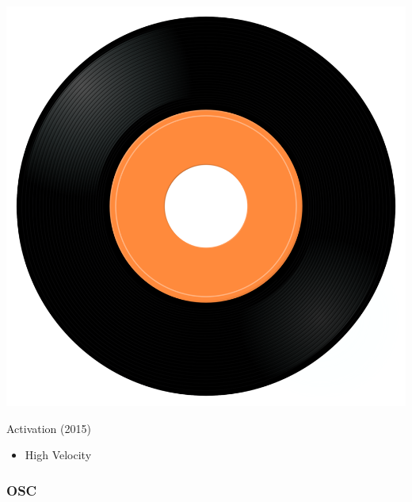\begin{minipage}[t]{0.25\textwidth}\vspace{0pt}
\captionsetup{type=figure}
\includegraphics[width=\textwidth]{Images/cover.png}
\caption*{Activation (2015)}
\end{minipage}
\begin{minipage}[t]{0.25\textwidth}\vspace{0pt}
\begin{itemize}[nosep,leftmargin=1em,labelwidth=*,align=left]
	\setlength{\itemsep}{0pt}
	\item High Velocity
\end{itemize}
\end{minipage}

\subsubsection{OSC}

